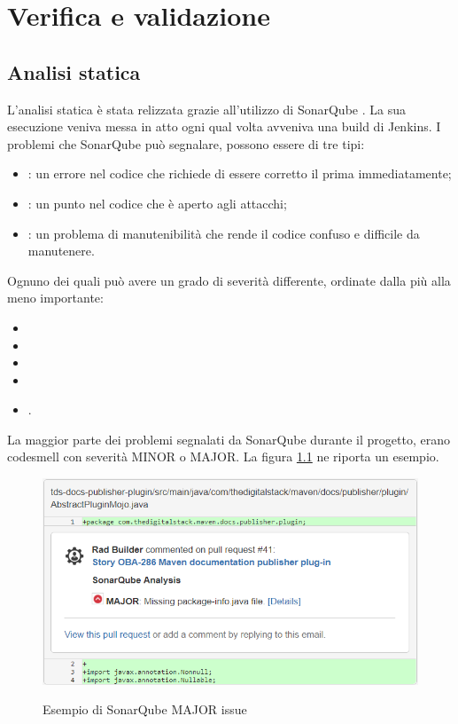 
\chapter{Verifica e validazione}
\label{cap:testing} 

\section{Analisi statica}
L'analisi statica è stata relizzata grazie all'utilizzo di SonarQube \cite{site:sonarqube}.
La sua esecuzione veniva messa in atto ogni qual volta avveniva una build di Jenkins.
I problemi che SonarQube può segnalare, possono essere di tre tipi:
\begin{itemize}
    \item {}: un errore nel codice che richiede di essere corretto il prima immediatamente;
    \item {}: un punto nel codice che è aperto agli attacchi;
    \item {}:  un problema di manutenibilità che rende il codice confuso e difficile da manutenere.
\end{itemize}
Ognuno dei quali può avere un grado di severità differente, ordinate dalla più alla meno importante:
\begin{itemize}
    \item {}
    \item {}
    \item {}
    \item {}
    \item {}.
\end{itemize}

La maggior parte dei problemi segnalati da SonarQube durante il progetto, erano codesmell con severità MINOR o MAJOR.
La figura \ref{sonarMAJORissue} ne riporta un esempio.

\clearpage

\begin{figure}[H]
    \centering
    \includegraphics[width=\textwidth]{immagini/major-issue.png}\\
    \caption{Esempio di SonarQube MAJOR issue}
    \label{sonarMAJORissue}
\end{figure}

